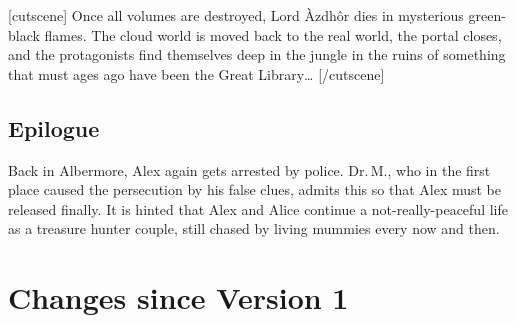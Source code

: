 \documentclass{gd-document}
\newcommand\DrM{Dr.\,M.\xspace}
\newcommand\Azdhor{Lord Àzdhôr\xspace}
\begin{document}
[cutscene]
Once all volumes are destroyed, \Azdhor dies in mysterious green-black flames. The
cloud world is moved back to the real world, the portal closes, and
the protagonists find themselves deep in the jungle in the ruins of
something that must ages ago have been the Great Library…
[/cutscene]

\subsection{Epilogue}

Back in Albermore, Alex again gets arrested by police. \DrM, who in
the first place caused the persecution by his false clues, admits this
so that Alex must be released finally. It is hinted that Alex and
Alice continue a not-really-peaceful life as a treasure hunter
couple, still chased by living mummies every now and then.

\section{Changes since Version 1}
\end{document}
